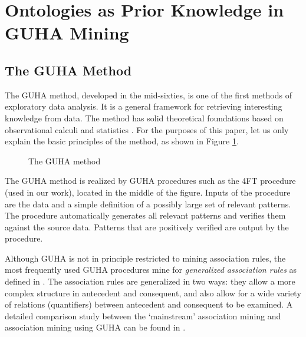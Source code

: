\section{Ontologies as Prior Knowledge in GUHA Mining} \label{OntologiesAssociation}

\subsection{The GUHA Method}
\label{section:guha}
The GUHA method, developed in the mid-sixties, is one of the first methods of exploratory data analysis. 
It is a general framework for retrieving interesting knowledge from data. 
The method has solid theoretical foundations based on observational calculi and statistics \cite{GUHA}. 
For the purposes of this paper, let us only explain the basic principles of the method, as shown in Figure \ref{fig:GUHA}.

\begin{figure}[ht]
\centering
\mbox{}
\caption{The GUHA method}
\label{fig:GUHA}
\end{figure}

The GUHA method is realized by GUHA procedures such as the 4FT procedure (used in our work), located in the middle of the figure. 
Inputs of the procedure are the data and a simple definition of a possibly large set of relevant patterns. 
The procedure automatically generates all relevant patterns and verifies them against the source data. 
Patterns that are positively verified are output by the procedure.

Although GUHA is not in principle restricted to mining association rules, the most frequently used GUHA procedures mine for \emph{generalized association rules} as defined in \cite{Rauch}. 
The association rules are generalized in two ways: they allow a more complex structure in antecedent and consequent, and also allow for a wide variety of relations (quantifiers) between antecedent and consequent to be examined. 
A detailed comparison study between the `mainstream' association mining and association mining using GUHA can be found in \cite{HajekHolena}.



